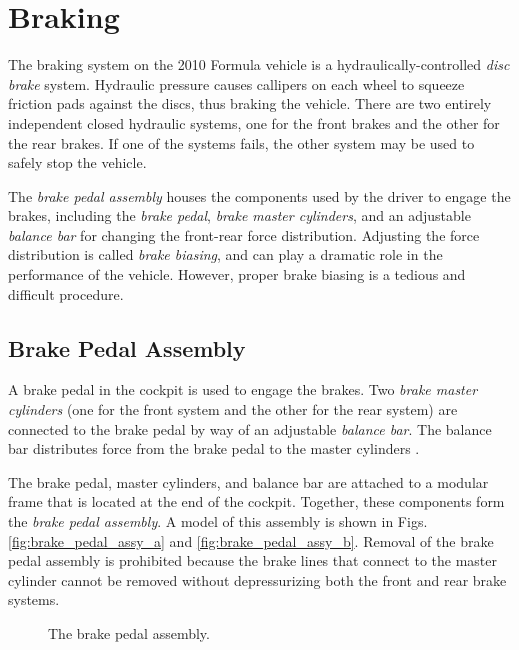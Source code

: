 \section{Braking}

The braking system on the 2010 Formula vehicle is a hydraulically-controlled \emph{disc brake} system. Hydraulic pressure causes callipers on each wheel to squeeze friction pads against the discs, thus braking the vehicle. There are two entirely independent closed hydraulic systems, one for the front brakes and the other for the rear brakes. If one of the systems fails, the other system may be used to safely stop the vehicle. 

The \emph{brake pedal assembly} houses the components used by the driver to engage the brakes, including the \emph{brake pedal}, \emph{brake master cylinders}, and an adjustable \emph{balance bar} for changing the front-rear force distribution. Adjusting the force distribution is called \emph{brake biasing}, and can play a dramatic role in the performance of the vehicle. However, proper brake biasing is a tedious and difficult procedure.

\subsection{Brake Pedal Assembly}

A brake pedal in the cockpit is used to engage the brakes. Two \emph{brake master cylinders} (one for the front system and the other for the rear system) are connected to the brake pedal by way of an adjustable \emph{balance bar}. The balance bar distributes force from the brake pedal to the master cylinders \cite{TiltonBrakeBias}. 

The brake pedal, master cylinders, and balance bar are attached to a modular frame that is located at the end of the cockpit. Together, these components form the \emph{brake pedal assembly}. A model of this assembly is shown in Figs. \ref{fig:brake_pedal_assy_a} and \ref{fig:brake_pedal_assy_b}. Removal of the brake pedal assembly is prohibited because the brake lines that connect to the master cylinder cannot be removed without depressurizing both the front and rear brake systems. 

\begin{figure}[h!]
	\centering
    \caption{The brake pedal assembly.}
    \label{fig:brake_pedal_assy}
\end{figure}

